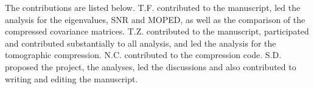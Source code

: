 	
	The contributions are listed below. T.F. contributed to the manuscript, led the analysis for the eigenvalues, SNR and MOPED, as well as the comparison of the compressed covariance matrices. T.Z. contributed to the manuscript, participated and contributed substantially to all analysis, and led the analysis for the tomographic compression. N.C. contributed to the compression code. S.D. proposed the project, the analyses, led the discussions and also contributed to writing and editing the manuscript.